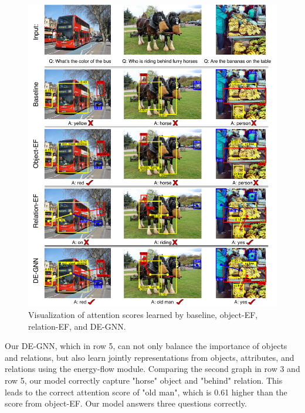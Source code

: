 \documentclass[letterpaper]{article} %
\begin{document}
\begin{figure}[h] 
    \flushleft
    \centering 
    \includegraphics[scale=0.32]{./pic/visual2.pdf} 
    \caption{Visualization of attention scores learned by baseline, object-EF, relation-EF, and DE-GNN.} 
    \label{visual} 
\end{figure}

Our DE-GNN, which in row 5, can not only balance the importance of objects and relations, but also learn jointly representations from objects, attributes, and relations using the energy-flow module. Comparing the second graph in row 3 and row 5, our model correctly capture "horse" object and "behind" relation. This leads to the correct attention score of "old man", which is 0.61 higher than the score from object-EF. Our model answers three questions correctly.
\end{document}
